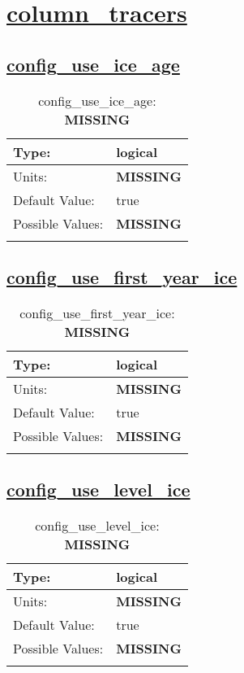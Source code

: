\section[column\_tracers]{\hyperref[sec:nm_tab_column_tracers]{column\_tracers}}
\label{sec:nm_sec_column_tracers}
\subsection[config\_use\_ice\_age]{\hyperref[sec:nm_tab_column_tracers]{config\_use\_ice\_age}}
\label{subsec:nm_sec_config_use_ice_age}
\begin{center}
\begin{longtable}{| p{2.0in} || p{4.0in} |}
    \hline
    Type: & logical \\
    \hline
    Units: & {\bf \color{red} MISSING} \\
    \hline
    Default Value: & true \\
    \hline
    Possible Values: & {\bf \color{red} MISSING} \\
    \hline
    \caption{config\_use\_ice\_age: {\bf \color{red} MISSING}}
\end{longtable}
\end{center}
\subsection[config\_use\_first\_year\_ice]{\hyperref[sec:nm_tab_column_tracers]{config\_use\_first\_year\_ice}}
\label{subsec:nm_sec_config_use_first_year_ice}
\begin{center}
\begin{longtable}{| p{2.0in} || p{4.0in} |}
    \hline
    Type: & logical \\
    \hline
    Units: & {\bf \color{red} MISSING} \\
    \hline
    Default Value: & true \\
    \hline
    Possible Values: & {\bf \color{red} MISSING} \\
    \hline
    \caption{config\_use\_first\_year\_ice: {\bf \color{red} MISSING}}
\end{longtable}
\end{center}
\subsection[config\_use\_level\_ice]{\hyperref[sec:nm_tab_column_tracers]{config\_use\_level\_ice}}
\label{subsec:nm_sec_config_use_level_ice}
\begin{center}
\begin{longtable}{| p{2.0in} || p{4.0in} |}
    \hline
    Type: & logical \\
    \hline
    Units: & {\bf \color{red} MISSING} \\
    \hline
    Default Value: & true \\
    \hline
    Possible Values: & {\bf \color{red} MISSING} \\
    \hline
    \caption{config\_use\_level\_ice: {\bf \color{red} MISSING}}
\end{longtable}
\end{center}
